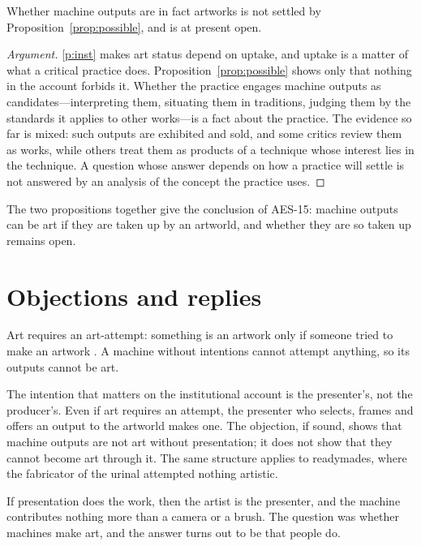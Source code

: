 \documentclass{situationist-preprint}
\begin{document}
\begin{proposition}\label{prop:open}
Whether machine outputs are in fact artworks is not settled by Proposition~\ref{prop:possible}, and is at present open.
\end{proposition}

\begin{proof}[Argument]
\ref{p:inst} makes art status depend on uptake, and uptake is a matter of what a critical practice does. Proposition~\ref{prop:possible} shows only that nothing in the account forbids it. Whether the practice engages machine outputs as candidates---interpreting them, situating them in traditions, judging them by the standards it applies to other works---is a fact about the practice. The evidence so far is mixed: such outputs are exhibited and sold, and some critics review them as works, while others treat them as products of a technique whose interest lies in the technique. A question whose answer depends on how a practice will settle is not answered by an analysis of the concept the practice uses.
\end{proof}

The two propositions together give the conclusion of AES-15: machine outputs can be art if they are taken up by an artworld, and whether they are so taken up remains open.

\section{Objections and replies}

\begin{objection}
Art requires an art-attempt: something is an artwork only if someone tried to make an artwork \citep{MagUidhir2013}. A machine without intentions cannot attempt anything, so its outputs cannot be art.
\end{objection}

\begin{reply}
The intention that matters on the institutional account is the presenter's, not the producer's. Even if art requires an attempt, the presenter who selects, frames and offers an output to the artworld makes one. The objection, if sound, shows that machine outputs are not art without presentation; it does not show that they cannot become art through it. The same structure applies to readymades, where the fabricator of the urinal attempted nothing artistic.
\end{reply}

\begin{objection}
If presentation does the work, then the artist is the presenter, and the machine contributes nothing more than a camera or a brush. The question was whether machines make art, and the answer turns out to be that people do.
\end{objection}
\end{document}
